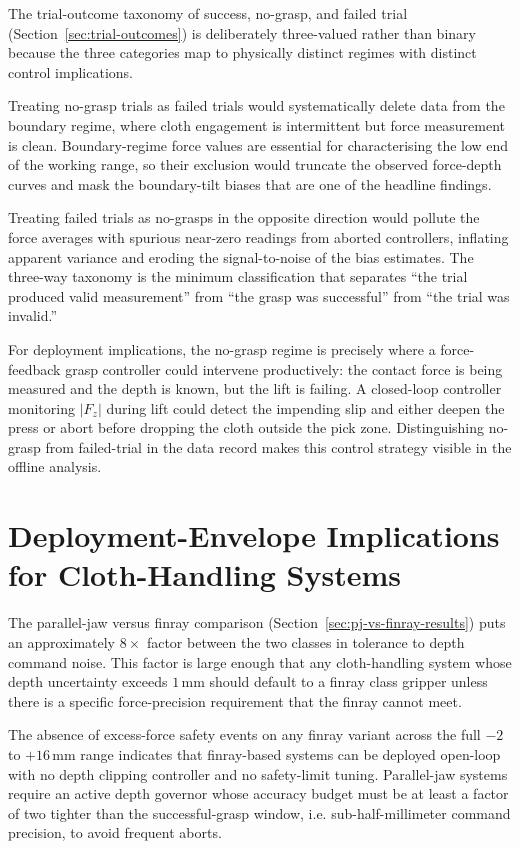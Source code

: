 The trial-outcome taxonomy of success, no-grasp, and failed trial
(Section~\ref{sec:trial-outcomes}) is deliberately three-valued rather
than binary because the three categories map to physically distinct
regimes with distinct control implications.

Treating no-grasp trials as failed trials would systematically delete
data from the boundary regime, where cloth engagement is intermittent
but force measurement is clean. Boundary-regime force values are
essential for characterising the low end of the working range, so
their exclusion would truncate the observed force-depth curves and
mask the boundary-tilt biases that are one of the headline findings.

Treating failed trials as no-grasps in the opposite direction would
pollute the force averages with spurious near-zero readings from
aborted controllers, inflating apparent variance and eroding the
signal-to-noise of the bias estimates. The three-way taxonomy is the
minimum classification that separates ``the trial produced valid
measurement'' from ``the grasp was successful'' from ``the trial was
invalid.''

For deployment implications, the no-grasp regime is precisely where a
force-feedback grasp controller could intervene productively: the
contact force is being measured and the depth is known, but the lift
is failing. A closed-loop controller monitoring $|F_z|$ during lift
could detect the impending slip and either deepen the press or abort
before dropping the cloth outside the pick zone. Distinguishing
no-grasp from failed-trial in the data record makes this control
strategy visible in the offline analysis.

\section{Deployment-Envelope Implications for Cloth-Handling Systems}
\label{sec:deployment-envelope}

The parallel-jaw versus finray comparison
(Section~\ref{sec:pj-vs-finray-results}) puts an approximately
$8\times$ factor between the two classes in tolerance to depth command
noise. This factor is large enough that any cloth-handling system
whose depth uncertainty exceeds $1$\,mm should default to a finray
class gripper unless there is a specific force-precision requirement
that the finray cannot meet.

The absence of excess-force safety events on any finray variant across
the full $-2$ to $+16$\,mm range indicates that finray-based systems
can be deployed open-loop with no depth clipping controller and no
safety-limit tuning. Parallel-jaw systems require an active depth
governor whose accuracy budget must be at least a factor of two
tighter than the successful-grasp window, i.e. sub-half-millimeter
command precision, to avoid frequent aborts.

